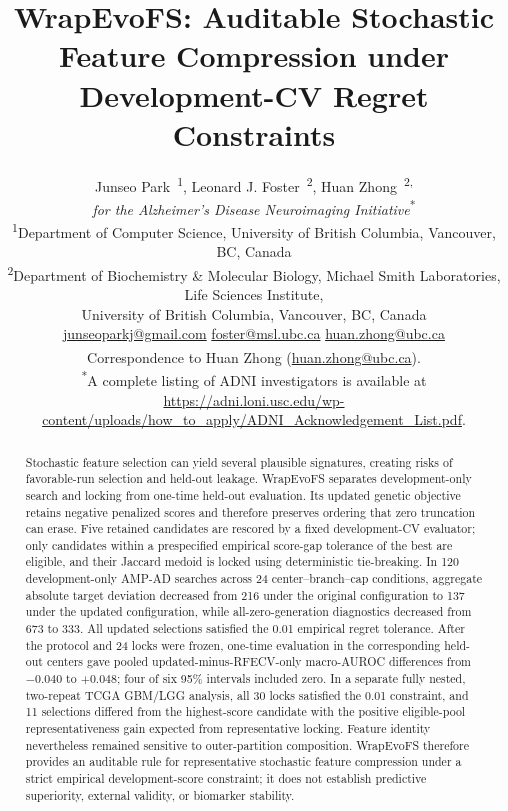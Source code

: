\documentclass[10pt,letterpaper]{article}
\title{\LARGE\bfseries WrapEvoFS: Auditable Stochastic Feature Compression under Development-CV Regret Constraints}
\author{%
  \normalsize Junseo Park~\orcidlink{0009-0002-4385-6987}\textsuperscript{1}, Leonard J. Foster~\orcidlink{0000-0001-8551-4817}\textsuperscript{2}, Huan Zhong~\orcidlink{0000-0002-7294-2254}\textsuperscript{2,\dagger}\\[0.2em]
  \small\textit{for the Alzheimer's Disease Neuroimaging Initiative}\textsuperscript{*}\\[0.25em]
  \small \textsuperscript{1}Department of Computer Science, University of British Columbia, Vancouver, BC, Canada\\[0.15em]
  \small \textsuperscript{2}Department of Biochemistry \& Molecular Biology, Michael Smith Laboratories, Life Sciences Institute,\\[-0.05em]
  \small University of British Columbia, Vancouver, BC, Canada\\[0.25em]
  \footnotesize
  \href{mailto:junseoparkj@gmail.com}{junseoparkj@gmail.com}\quad
  \href{mailto:foster@msl.ubc.ca}{foster@msl.ubc.ca}\quad
  \href{mailto:huan.zhong@ubc.ca}{huan.zhong@ubc.ca}\\[0.2em]
  \footnotesize \textsuperscript{\dagger}Correspondence to Huan Zhong (\href{mailto:huan.zhong@ubc.ca}{huan.zhong@ubc.ca}).\\[0.15em]
  \scriptsize \textsuperscript{*}A complete listing of ADNI investigators is available at \url{https://adni.loni.usc.edu/wp-content/uploads/how_to_apply/ADNI_Acknowledgement_List.pdf}.%
}
\date{}
\begin{document}
\maketitle
\modulolinenumbers[1]
\linenumbers

\begin{abstract}
Stochastic feature selection can yield several plausible signatures, creating risks of favorable-run selection and held-out leakage. WrapEvoFS separates development-only search and locking from one-time held-out evaluation. Its updated genetic objective retains negative penalized scores and therefore preserves ordering that zero truncation can erase. Five retained candidates are rescored by a fixed development-CV evaluator; only candidates within a prespecified empirical score-gap tolerance of the best are eligible, and their Jaccard medoid is locked using deterministic tie-breaking. In 120 development-only AMP-AD searches across 24 center--branch--cap conditions, aggregate absolute target deviation decreased from 216 under the original configuration to 137 under the updated configuration, while all-zero-generation diagnostics decreased from 673 to 333. All updated selections satisfied the 0.01 empirical regret tolerance. After the protocol and 24 locks were frozen, one-time evaluation in the corresponding held-out centers gave pooled updated-minus-RFECV-only macro-AUROC differences from $-0.040$ to $+0.048$; four of six 95\% intervals included zero. In a separate fully nested, two-repeat TCGA GBM/LGG analysis, all 30 locks satisfied the 0.01 constraint, and 11 selections differed from the highest-score candidate with the positive eligible-pool representativeness gain expected from representative locking. Feature identity nevertheless remained sensitive to outer-partition composition. WrapEvoFS therefore provides an auditable rule for representative stochastic feature compression under a strict empirical development-score constraint; it does not establish predictive superiority, external validity, or biomarker stability.
\end{abstract}



\FloatBarrier


\end{document}
